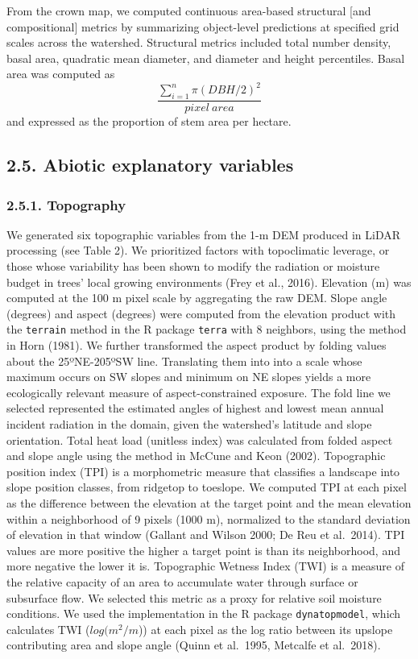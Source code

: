\documentclass[
  12pt,
]{article}
\begin{document}
From the crown map, we computed continuous area-based structural {[}and
compositional{]} metrics by summarizing object-level predictions at
specified grid scales across the watershed. Structural metrics included
total number density, basal area, quadratic mean diameter, and diameter
and height percentiles. Basal area was computed as
\[\frac{\sum_{i=1}^{n}\pi (DBH/2)^2}{pixel \ area}\] and expressed as
the proportion of stem area per hectare.

\subsection{2.5. Abiotic explanatory
variables}\label{abiotic-explanatory-variables}

\subsubsection{2.5.1. Topography}\label{topography}

We generated six topographic variables from the 1-m DEM produced in
LiDAR processing (see Table 2). We prioritized factors with topoclimatic
leverage, or those whose variability has been shown to modify the
radiation or moisture budget in trees' local growing environments (Frey
et al., 2016). Elevation (m) was computed at the 100 m pixel scale by
aggregating the raw DEM. Slope angle (degrees) and aspect (degrees) were
computed from the elevation product with the \texttt{terrain} method in
the R package \texttt{terra} with 8 neighbors, using the method in Horn
(1981). We further transformed the aspect product by folding values
about the 25ºNE-205ºSW line. Translating them into into a scale whose
maximum occurs on SW slopes and minimum on NE slopes yields a more
ecologically relevant measure of aspect-constrained exposure. The fold
line we selected represented the estimated angles of highest and lowest
mean annual incident radiation in the domain, given the watershed's
latitude and slope orientation. Total heat load (unitless index) was
calculated from folded aspect and slope angle using the method in McCune
and Keon (2002). Topographic position index (TPI) is a morphometric
measure that classifies a landscape into slope position classes, from
ridgetop to toeslope. We computed TPI at each pixel as the difference
between the elevation at the target point and the mean elevation within
a neighborhood of 9 pixels (1000 m), normalized to the standard
deviation of elevation in that window (Gallant and Wilson 2000; De Reu
et al.~2014). TPI values are more positive the higher a target point is
than its neighborhood, and more negative the lower it is. Topographic
Wetness Index (TWI) is a measure of the relative capacity of an area to
accumulate water through surface or subsurface flow. We selected this
metric as a proxy for relative soil moisture conditions. We used the
implementation in the R package \texttt{dynatopmodel}, which calculates
TWI (\(log(m^2/m\))) at each pixel as the log ratio between its upslope
contributing area and slope angle (Quinn et al.~1995, Metcalfe et
al.~2018).
\end{document}
